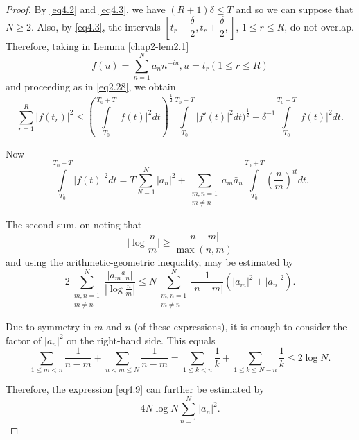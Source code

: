 \begin{proof} %
By \eqref{eq4.2} and \eqref{eq4.3}, we have $(R+1) \delta \leq T$ and
so we can suppose that $N \geq 2$. Also, by \eqref{eq4.3}, the
intervals  $\left[ t_r - \dfrac {\delta}{2}, t_r + \dfrac{\delta}{2},
  \right]$, $1 \leq r \leq R$, do not overlap. Therefore, taking in
Lemma \ref{chap2-lem2.1} 
\begin{equation*}
f(u) = \sum_{n=1}^N  a_n n^{-iu}, u = t_r (1 \leq r \leq R)
\tag{4.5}\label{eq4.5} 
\end{equation*}
and proceeding as in \eqref{eq2.28}, we obtain
\begin{equation*}
\sum_{r=1}^R |f(t_r)|^2 \leq (\int\limits_{T_0}^{T_0 +T} |f(t)|^2
dt)^{\frac{1}{2}}  \int\limits_{T_0}^{T_0 +T} |f'(t)|^2
dt)^{\frac{1}{2}} + \delta ^{-1} \int\limits_{T_0}^{T_0 +T} |f(t)|^2
dt. \tag{4.6}\label{eq4.6} 
\end{equation*} 

Now
\begin{equation*}
\int\limits_{T_0}^{T_0+T}|f(t)|^2 dt = T \sum_{N=1}^N |a_n|^2 +
\sum_{\substack{m,n = 1\\ m \neq n}} a_m \bar{a}_n
\int\limits_{T_0}^{T_0+T} (\frac{n}{m})^{it} dt. \tag{4.7}\label{eq4.7} 
\end{equation*}\pageoriginale 

The second sum, on noting that
\begin{equation*}
\bigg| \log \frac{n}{m} \bigg| \geq \frac{|n-m|} {\max (n,m)}
\tag{4.8}\label{eq4.8} 
\end{equation*} 
and using the arithmetic-geometric inequality, may be estimated by 
\begin{equation*}
2 \sum_{\substack{m,n = 1\\m \neq n}}^N \frac{|a_m{^a}{_n}|}{|\log
  \frac{n}{m}|} \leq N \sum_{\substack{m,n=1\\ m \neq n}}^N
\frac{1}{|n-m|} (|a_m|^2 + |a_n|^2). \tag{4.9}\label{eq4.9} 
\end{equation*} 

Due to symmetry in $m$ and $n$ (of these expressions), it is enough
to consider the factor of $|a_n|^2$ on the right-hand side. This
equals 
\begin{equation*}
\sum_{1 \leq m < n} \frac{1}{n-m} + \sum_{n < m \leq N} \frac{1}{n-m}
=  \sum_{1 \leq k < n} \frac{1}{k} + \sum_{1 \leq k \leq N-n}
\frac{1}{k}\leq 2 \log N. \tag{4.10}\label{eq4.10} 
\end{equation*} 

Therefore, the expression \eqref{eq4.9} can further be estimated by
\begin{equation*}
4 N \log N \sum_{n=1}^{N} |a_n|^2. \tag{4.11}\label{eq4.11}
\end{equation*} 
 

\end{proof}
